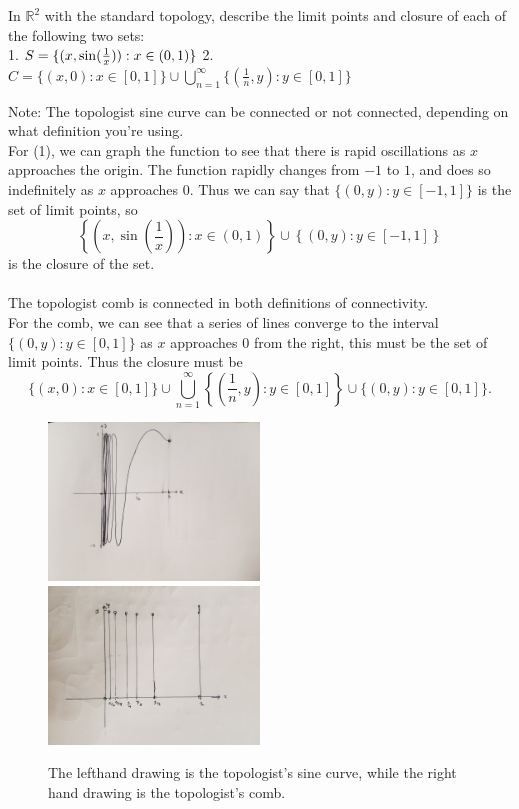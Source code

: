 \documentclass[letterpaper,12pt,twoside]{maths}
\begin{document}
\begin{exercise}[Exercise 3.24]
In $\mathbb{R}^2$ with the standard topology,
describe the limit points and closure of each of the following two
sets:\\
1. $S = \{(x, \sin(\frac{1}{x})) : x \in (0, 1)\}\\$ 2. $C = \{(x,0) :
x \in [0, 1]\} \cup \bigcup\limits_{n=1}^\infty \{(\frac{1}{n}, y) : y
\in [0, 1] \}$ 
\end{exercise}

\begin{solution}
Note:
The topologist sine curve can be connected or not connected, depending
on what definition you're using. \\
For (1), we can graph the function to see that there is rapid
oscillations as $x$ approaches the origin. The function rapidly
changes from $-1$ to $1$, and does so indefinitely as $x$ approaches
0. Thus we can say that $\{(0, y) : y \in [-1,
1]\}$ is the set of limit points, so 
\[\left\{\left(x, \sin\left(\frac{1}{x}\right)\right) : x \in
(0, 1)\right\} \cup \left\{(0, y) : y \in [-1, 1]\right\}\] is the closure of the set.
\\
\\
The topologist comb is connected in both definitions of connectivity.
\\
For the comb, we can see that a series of lines converge to the
interval $\{(0, y) : y \in [0, 1]\}$ as $x$ approaches $0$ from the
right, this must be the set of limit points. Thus the closure must be 
\[
    \{(x,0) : x \in [0, 1]\} \cup
\bigcup\limits_{n=1}^\infty \left\{\left(\frac{1}{n}, y\right) : 
y \in [0, 1] \right\} \cup
\{(0, y) : y \in [0, 1]\}.
\]
\begin{figure}[h]
    \includegraphics[width=0.5\textwidth]{topologist_sine_curve.jpg}
    \includegraphics[width=0.5\textwidth]{topologist_comb.jpg}
    \caption{The lefthand drawing is the topologist's sine curve,
    while the right hand drawing is the topologist's comb.}
\end{figure}

\end{solution}
\end{document}
